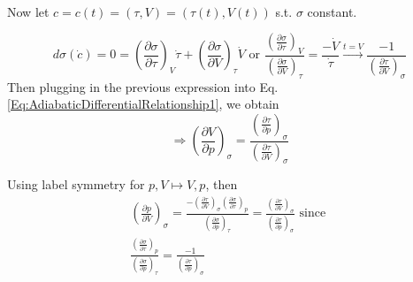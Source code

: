 \documentclass[twoside,landscape,10pt]{amsart}
\theoremstyle{plain}
\theoremstyle{definition}
\theoremstyle{remark}
\theoremstyle{remark}
\begin{document}
\begin{multicols*}{2}
\quad \\
Now let $c=c(t) = (\tau, V) = (\tau(t), V(t))$ s.t. $\sigma$ constant.

\[
d\sigma(\dot{c}) = 0 = \left( \frac{\partial \sigma}{\partial \tau} \right)_V \dot{\tau} + \left( \frac{\partial \sigma}{\partial V} \right)_{\tau} \dot{V} \text{ or } \frac{ \left( \frac{\partial \sigma}{\partial \tau}\right)_V }{ \left( \frac{\partial \sigma}{\partial V}\right)_{\tau} } = \frac{  - \dot{V}}{\dot{\tau}} \xrightarrow{ t = V} \frac{-1}{ \left( \frac{\partial \tau}{\partial V} \right)_{\sigma} }
\]
Then plugging in the previous expression into Eq. \ref{Eq:AdiabaticDifferentialRelationship1}, we obtain
\begin{equation}\label{Eq:AdiabaticCompressionOfV}
\Longrightarrow \left( \frac{\partial V}{ \partial p} \right)_{\sigma} = \frac{ \left( \frac{\partial \tau }{\partial p} \right)_{\sigma} }{ \left( \frac{\partial \tau}{\partial V} \right)_{\sigma} }
\end{equation}

Using label symmetry for $p, V \mapsto V, p$, then
\[
\begin{gathered}
\left( \frac{\partial p}{\partial V} \right)_{\sigma} =  \frac{ - \left( \frac{\partial \tau}{\partial V} \right)_{\sigma} \left( \frac{\partial \sigma}{\partial \tau}\right)_p }{ \left( \frac{\partial \sigma}{\partial p}\right)_{\tau} } = \frac{ \left( \frac{\partial \tau }{\partial V} \right)_{\sigma} }{ \left( \frac{\partial \tau}{\partial p} \right)_{\sigma} } \text{ since } \\
\frac{ \left( \frac{\partial \sigma}{\partial \tau}\right)_p }{ \left( \frac{\partial \sigma}{\partial p}\right)_{\tau} } = \frac{-1}{ \left( \frac{\partial \tau}{\partial p} \right)_{\sigma} }
\end{gathered}
\]


\end{multicols*}
\end{document}
